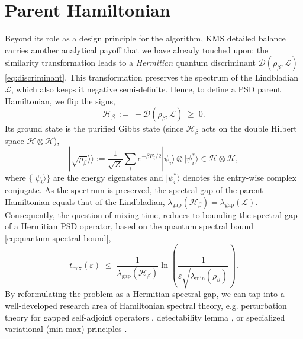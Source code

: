 \section{Parent Hamiltonian} Beyond its role as a design principle for the algorithm, KMS detailed balance carries another analytical payoff that we have already touched upon: the similarity transformation leads to a \emph{Hermitian} quantum discriminant $\mathcal{D}(\rho_\beta, \mathcal{L})$ \eqref{eq:discriminant}. This transformation preserves the spectrum of the Lindbladian $\mathcal{L}$, which also keeps it negative semi-definite. Hence, to define a PSD parent Hamiltonian, we flip the signs, 
\begin{equation} \label{eq:parent-ham-defi}
    \mathcal{H}_\beta \;:=\; -\mathcal{D}(\rho_\beta, \mathcal{L}) \;\geq\; 0.
\end{equation}
Its ground state is the purified Gibbs state (since $\mathcal{H}_\beta$ acts on the double Hilbert space $\mathcal{H}\otimes\mathcal{H}$),
\begin{equation}
    |\sqrt{\rho_\beta}\rangle\rangle := \frac{1}{\sqrt{Z}}\sum_i e^{-\beta E_i/2}|\psi_i\rangle
   \otimes |\psi_i^*\rangle \in \mathcal{H}\otimes\mathcal{H},
\end{equation}
where $\{|\psi_i\rangle\}$ are the energy eigenstates and $|\psi_i^*\rangle$ denotes the entry-wise complex conjugate. As the spectrum is preserved, the spectral gap of the parent Hamiltonian equals that of the Lindbladian, $\lambda_\text{gap}(\mathcal{H}_\beta) = \lambda_\text{gap}(\mathcal{L})$. Consequently, the question of mixing time, reduces to bounding the spectral gap of a Hermitian PSD operator, based on the quantum spectral bound \eqref{eq:quantum-spectral-bound},
\begin{equation}\label{eq:parent-ham-gap-mixing}
    t_\text{mix}(\varepsilon) \;\leq\; \frac{1}{\lambda_\text{gap}(\mathcal{H}_\beta)} \ln \left( \frac{1}{\varepsilon\sqrt{\lambda_{\min}(\rho_\beta)}} \right).
\end{equation}
By reformulating the problem as a Hermitian spectral gap, we can tap into a well-developed research area of Hamiltonian spectral theory, e.g. perturbation theory for gapped self-adjoint operators \cite{kato1966perturbation}, detectability lemma \cite{aharonov2009detectability,anshu2016simple}, or specialized variational (min-max) principles \cite{bhatia2013matrix}.


